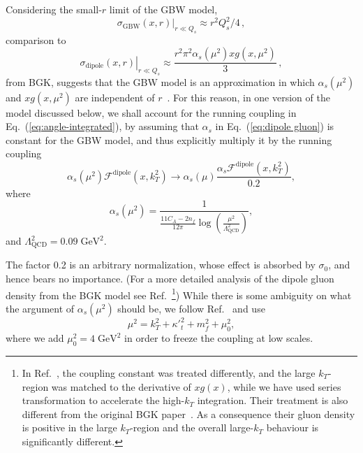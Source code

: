 \documentclass[11pt]{article}
\newcommand{\fdp}[0]{\mathcal{F}^{\mathrm{dipole}}}
\newcommand{\GeV}[0]{\mathrm{GeV}}
\begin{document}
Considering the small-$r$ limit of the GBW model, 
\begin{equation}
    \left.\sigma_{\mathrm{GBW}}\left(x,r\right)\right|_{r\ll Q_s}\approx r^2
    Q_s^2/4\,,
\end{equation}
comparison to 
\begin{equation}
\left. \sigma_{\mathrm{dipole}}\left(x,r\right)\right|_{r\ll
Q_s}\approx\frac{r^2 \pi^2\alpha_s(\mu^2)xg(x,\mu^2)}{3}\,,
\end{equation} 
%
from BGK, suggests that the GBW model is an approximation in which
$\alpha_s(\mu^2)$ and $xg(x,\mu^2)$ are independent of
$r$~\cite{Bartels:2002cj}.  
%
For this reason, in one version of the model discussed below, we shall account
for the running coupling in Eq.~(\ref{eq:angle-integrated}), by assuming that
$\alpha_s$ in Eq.~(\ref{eq:dipole gluon}) is constant for the GBW model, and
thus explicitly multiply it by the running coupling
%
\begin{equation}
\alpha_s(\mu^2)\fdp(x,k_T^2)\rightarrow \alpha_s(\mu)\frac{\alpha_s\fdp(x,k_T^2)}{0.2},
\end{equation}
where
%
\begin{equation}
\alpha_s(\mu^2)=\frac{1}{\frac{11 C_A-2n_f}{12\pi}\log\left(\frac{\mu^2}{\Lambda_{\mathrm{QCD}}^2 }\right)},
\end{equation}
and  $\Lambda_{\mathrm{QCD}}^2=0.09\;\GeV^2$.

The factor 0.2 is an arbitrary normalization, whose effect is absorbed by
$\sigma_0$, and hence bears no importance.  (For a more detailed analysis of the
dipole gluon density from the BGK model see
Ref.~\cite{Luszczak:2022fkf}\footnote{In Ref.~\cite{Luszczak:2022fkf}, the
coupling constant was treated differently, and the large $k_T$-region was
matched to the derivative of $xg(x)$, while we have used series transformation
to accelerate the high-$k_T$ integration. Their treatment is also different from
the original BGK paper~\cite{Bartels:2002cj}. As a consequence their gluon
density is positive in the large $k_T$-region and the overall large-$k_T$
behaviour is significantly different.}) While there is some ambiguity on what
the argument of $\alpha_s(\mu^2)$ should be, we follow
Ref.~\cite{Kwiecinski:1997ee} and use
%
\begin{equation}
	\mu^2=k_T^2+{\kappa'}_t^2+m_f^2+\mu^2_0,
\end{equation}
%
where we add $\mu^2_0=4\;\GeV^2$ in order to freeze the coupling at low scales.

\end{document}
